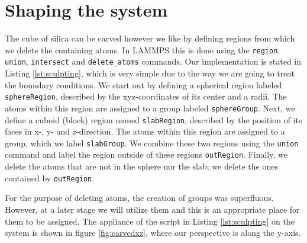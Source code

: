 \documentclass[twoside,english]{uiofysmaster}
\begin{document}
\section{Shaping the system}


The cube of silica can be carved however we like by defining regions from which we delete the containing atoms. 
In LAMMPS this is done using the \texttt{region}, \texttt{union}, \texttt{intersect} and \texttt{delete\_atoms} commands. 
Our implementation is stated in Listing \ref{lst:sculpting}, which is very simple due to the way we are going to treat the boundary conditions. 
We start out by defining a spherical region labeled \texttt{sphereRegion}, described by the xyz-coordinates of its center and a radii. 
The atoms within this region are assigned to a group labeled \texttt{sphereGroup}. 
Next, we define a cuboid (block) region named \texttt{slabRegion}, described by the position of its faces in x-, y- and z-direction. 
The atoms within this region are assigned to a group, which we label \texttt{slabGroup}.  
We combine these two regions using  the \texttt{union} command and label the region outside of these regions \texttt{outRegion}.
Finally, we delete the atoms that are not in the sphere nor the slab; we delete the ones contained by \texttt{outRegion}.

For the purpose of deleting atoms, the creation of groups was superfluous.
However, at a later stage we will utilize them and this is an appropriate place for them to be assigned. 
The appliance of the script in Listing \ref{lst:sculpting} on the system is shown in figure \ref{fig:carvedxz}, where our perspective is along the y-axis.
\end{document}

